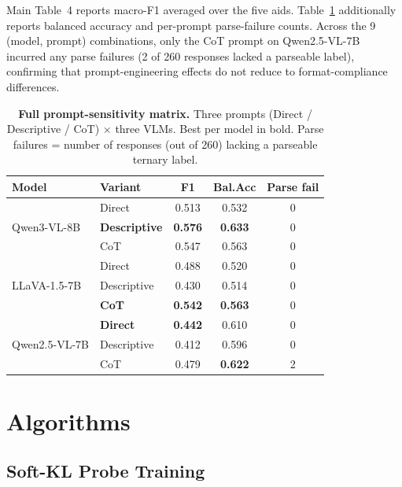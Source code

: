 \documentclass[conference]{IEEEtran}
\begin{document}
Main Table~4 reports macro-F1 averaged over the five aids. Table~\ref{tab:supp_prompts_full} additionally reports balanced accuracy and per-prompt parse-failure counts. Across the 9 (model, prompt) combinations, only the CoT prompt on Qwen2.5-VL-7B incurred any parse failures (2 of 260 responses lacked a parseable label), confirming that prompt-engineering effects do not reduce to format-compliance differences.

\begin{table}[!t]
\caption{\textbf{Full prompt-sensitivity matrix.} Three prompts (Direct / Descriptive / CoT) $\times$ three VLMs. Best per model in bold. Parse failures = number of responses (out of 260) lacking a parseable ternary label.}
\label{tab:supp_prompts_full}
\centering\scriptsize
\setlength{\tabcolsep}{5pt}
\begin{tabular}{@{}llccc@{}}
\toprule
\textbf{Model} & \textbf{Variant} & \textbf{F1} & \textbf{Bal.Acc} & \textbf{Parse fail} \\
\midrule
\multirow{3}{*}{Qwen3-VL-8B}   & Direct      & 0.513 & 0.532 & 0 \\
                                & \textbf{Descriptive} & \textbf{0.576} & \textbf{0.633} & 0 \\
                                & CoT         & 0.547 & 0.563 & 0 \\
\midrule
\multirow{3}{*}{LLaVA-1.5-7B}  & Direct      & 0.488 & 0.520 & 0 \\
                                & Descriptive & 0.430 & 0.514 & 0 \\
                                & \textbf{CoT}         & \textbf{0.542} & \textbf{0.563} & 0 \\
\midrule
\multirow{3}{*}{Qwen2.5-VL-7B} & \textbf{Direct}      & \textbf{0.442} & 0.610 & 0 \\
                                & Descriptive & 0.412 & 0.596 & 0 \\
                                & CoT         & 0.479 & \textbf{0.622} & 2 \\
\bottomrule
\end{tabular}
\end{table}

\FloatBarrier
\section{Algorithms}
\label{sec:supp_algo}

\subsection{Soft-KL Probe Training}
\end{document}
